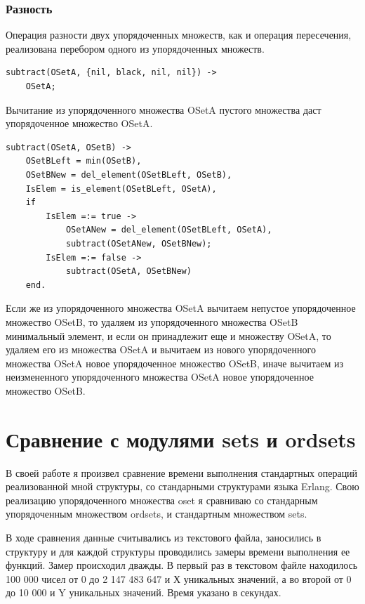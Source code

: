 		\subsubsection{Разность}
			Операция разности двух упорядоченных множеств, как и операция пересечения, реализована 
			перебором одного из упорядоченных множеств.
			\begin{lstlisting}
subtract(OSetA, {nil, black, nil, nil}) ->
    OSetA;
			\end{lstlisting}
			Вычитание из упорядоченного множества OSetA пустого множества даст упорядоченное множество OSetA.
			\begin{lstlisting}
subtract(OSetA, OSetB) ->
    OSetBLeft = min(OSetB),
    OSetBNew = del_element(OSetBLeft, OSetB),
    IsElem = is_element(OSetBLeft, OSetA),
    if 
        IsElem =:= true -> 
            OSetANew = del_element(OSetBLeft, OSetA),
            subtract(OSetANew, OSetBNew);
        IsElem =:= false -> 
            subtract(OSetA, OSetBNew)
    end.	 	
			\end{lstlisting}
			Если же из упорядоченного множества OSetA вычитаем непустое упорядоченное множество OSetB,
			то удаляем из упорядоченного множества OSetB минимальный элемент, и если он 
			принадлежит еще и множеству OSetA, то удаляем его из множества OSetA и вычитаем из нового
			упорядоченного множества OSetA новое упорядоченное множество OSetB, иначе вычитаем из неизмененного
			упорядоченного множества OSetA новое упорядоченное множество OSetB.
			
			
			
			
\section{Сравнение с модулями sets и ordsets}
	В своей работе я произвел сравнение времени выполнения стандартных операций реализованной мной структуры, со 
	стандарными структурами языка Erlang. Свою реализацию упорядоченного множества oset я сравниваю со стандарным 
	упорядоченным множеством ordsets, и	стандартным множеством sets.
	
	В ходе сравнения данные считывались из текстового файла, заносились в структуру и для каждой структуры проводились
	замеры времени выполнения ее функций. Замер происходил дважды. В первый раз в текстовом файле находилось 100 000 чисел 
	от 0 до 2 147 483 647 и Х уникальных значений, а во второй от 0 до 10 000 и Y уникальных значений. Время указано в секундах.
	
